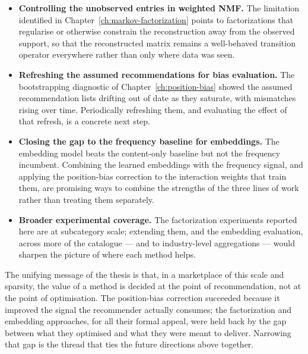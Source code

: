 \begin{itemize}
  \item \textbf{Controlling the unobserved entries in weighted NMF.} The
        limitation identified in Chapter~\ref{ch:markov-factorization} points to
        factorizations that regularise or otherwise constrain the reconstruction
        away from the observed support, so that the reconstructed matrix remains a
        well-behaved transition operator everywhere rather than only where data
        was seen.
  \item \textbf{Refreshing the assumed recommendations for bias evaluation.} The
        bootstrapping diagnostic of Chapter~\ref{ch:position-bias} showed the
        assumed recommendation lists drifting out of date as they saturate, with
        mismatches rising over time. Periodically refreshing them, and evaluating
        the effect of that refresh, is a concrete next step.
  \item \textbf{Closing the gap to the frequency baseline for embeddings.} The
        embedding model beats the content-only baseline but not the frequency
        incumbent. Combining the learned embeddings with the frequency signal, and
        applying the position-bias correction to the interaction weights that
        train them, are promising ways to combine the strengths of the three lines
        of work rather than treating them separately.
  \item \textbf{Broader experimental coverage.} The factorization experiments
        reported here are at subcategory scale; extending them, and the embedding
        evaluation, across more of the catalogue --- and to industry-level
        aggregations --- would sharpen the picture of where each method helps.
\end{itemize}

The unifying message of the thesis is that, in a marketplace of this scale and
sparsity, the value of a method is decided at the point of recommendation, not at
the point of optimisation. The position-bias correction succeeded because it
improved the signal the recommender actually consumes; the factorization and
embedding approaches, for all their formal appeal, were held back by the gap
between what they optimised and what they were meant to deliver. Narrowing that
gap is the thread that ties the future directions above together.
